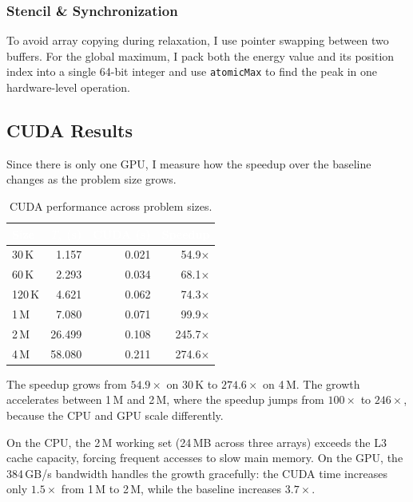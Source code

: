 \documentclass[10pt,dvipsnames,table,twocolumn]{article}
\let\oldtexttt\texttt
\renewcommand{\texttt}[1]{%
  {\small\colorbox{Mist}{\oldtexttt{\textcolor{DarkInk}{#1}}}}%
}
\begin{document}
\subsubsection{Stencil \& Synchronization}

To avoid array copying during relaxation, I use pointer swapping between two buffers. For the global maximum, I pack both the energy value and its position index into a single 64-bit integer and use \texttt{atomicMax} to find the peak in one hardware-level operation.


\subsection{CUDA Results}\label{sec:cuda-results}

Since there is only one GPU, I measure how the speedup over the baseline changes as the problem size grows.

\begin{table}[t]
\centering
\caption{CUDA performance across problem sizes.}\label{tbl:cuda}
\small
\begin{tabular}{@{}lrrr@{}}
\rowcolor{TableHead}
\textcolor{white}{\textbf{Size}} &
\textcolor{white}{\textbf{$T_s$ (s)}} &
\textcolor{white}{\textbf{CUDA (s)}} &
\textcolor{white}{\textbf{Speedup}} \\
\midrule
30\,K   & 1.157  & 0.021  & 54.9$\times$ \\
\rowcolor{TableRowAlt}
60\,K   & 2.293  & 0.034  & 68.1$\times$ \\
120\,K  & 4.621  & 0.062  & 74.3$\times$ \\
\rowcolor{TableRowAlt}
1\,M    & 7.080  & 0.071  & 99.9$\times$ \\
2\,M    & 26.499 & 0.108  & 245.7$\times$ \\
\rowcolor{TableRowAlt}
4\,M    & 58.080 & 0.211  & 274.6$\times$ \\
\bottomrule
\end{tabular}
\end{table}

The speedup grows from $54.9\times$ on 30\,K to $274.6\times$ on 4\,M. The growth accelerates between 1\,M and 2\,M, where the speedup jumps from $100\times$ to $246\times$, because the CPU and GPU scale differently.

On the CPU, the 2\,M working set (24\,MB across three arrays) exceeds the L3 cache capacity, forcing frequent accesses to slow main memory. On the GPU, the 384\,GB/s bandwidth handles the growth gracefully: the CUDA time increases only $1.5\times$ from 1\,M to 2\,M, while the baseline increases $3.7\times$.
\end{document}
